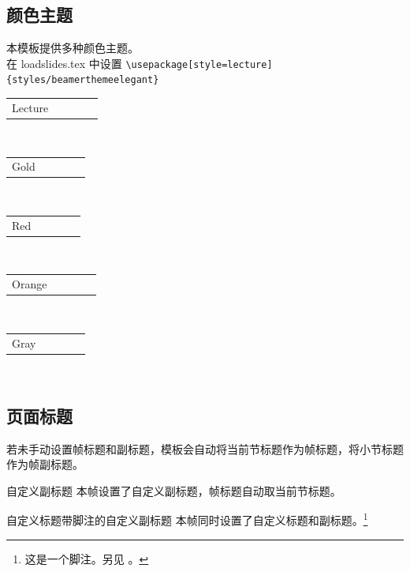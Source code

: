 \documentclass[
11pt,notheorems,hyperref={pdfauthor=whatever},aspectratio=169
]{beamer}
\begin{document}
\subsection{颜色主题}
\begin{frame}[fragile]
    \centering
    本模板提供多种颜色主题。\\
    在 loadslides.tex 中设置 \verb+\usepackage[style=lecture]{styles/beamerthemeelegant}+\\[0.8cm]
    \newcommand{\colorRow}[1]{
    \begin{tabular}{p{4cm}cccc}
    #1 & \cellcolor{primary}\hspace*{1cm} & \cellcolor{secondary}\hspace*{1cm} & \cellcolor{tertiary}\hspace*{1cm}\\
    \end{tabular}
    }
    \colorRow{Lecture}\\[0.3cm]
    \colorRow{Gold}\\[0.3cm]
    \colorRow{Red}\\[0.3cm]
    \colorRow{Orange}\\[0.3cm]
    \colorRow{Gray}\\[0.3cm]
\end{frame}

\subsection{页面标题}
\begin{frame}
    若未手动设置帧标题和副标题，模板会自动将当前节标题作为帧标题，将小节标题作为帧副标题。
\end{frame}

\begin{frame}{}{自定义副标题}
    本帧设置了自定义副标题，帧标题自动取当前节标题。
\end{frame}

\begin{frame}{自定义标题}{带脚注的自定义副标题}
    本帧同时设置了自定义标题和副标题。\footnote{这是一个脚注。另见 \citet{example_2022}。}
\end{frame}
\end{document}
